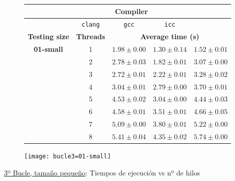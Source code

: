 \begin{figure}[H]
    \centering
    \begin{subfigure}{0.4\textwidth}
        \begin{adjustbox}{width=\textwidth} 
        \begin{tabular}{|c|c|c|c|c|}
            \hline
            \rowcolor{azul} \multicolumn{2}{|c|}{}&\multicolumn{3}{c|}{\textbf{Compiler}} \\ \hline
            \rowcolor{azul} \multicolumn{2}{|c|}{}&\texttt{clang}&\texttt{gcc}&\texttt{icc}\\ \hline
            \rowcolor{azul} \textbf{Testing size} & \textbf{Threads}&\multicolumn{3}{c|}{\textbf{Average time (s)}} \\ \hline
            \multirow{8}{1cm}{\textbf{01-small}} & 1 & \(1.98\pm{0.00}\) & \(1.30\pm{0.14}\) & \(1.52\pm{0.01}\) \\ \cline{2-5}
            & 2 & \(2.78\pm{0.03}\) & \(1.82\pm{0.01}\) & \(3.07\pm{0.00}\) \\ \cline{2-5}
            & 3 & \(2.72\pm{0.01}\) & \(2.22\pm{0.01}\) & \(3.28\pm{0.02}\) \\ \cline{2-5}
            & 4 & \(3.04\pm{0.01}\) & \(2.79\pm{0.00}\) & \(3.70\pm{0.01}\) \\ \cline{2-5}
            & 5 & \(4.53\pm{0.02}\) & \(3.04\pm{0.00}\) & \(4.44\pm{0.03}\) \\ \cline{2-5}
            & 6 & \(4.58\pm{0.01}\) & \(3.51\pm{0.01}\) & \(4.66\pm{0.05}\) \\ \cline{2-5}
            & 7 & \(5.09\pm{0.00}\) & \(3.80\pm{0.01}\) & \(5.22\pm{0.00}\) \\ \cline{2-5}
            & 8 & \(5.41\pm{0.04}\) & \(4.35\pm{0.02}\) & \(5.74\pm{0.00}\) \\ \hline
        \end{tabular}
        \end{adjustbox}
    \end{subfigure}
    \hfill
    \begin{subfigure}{0.5\textwidth}
        \texttt{[image: bucle3=01-small]}
    \end{subfigure}
    \caption{\underline{3º Bucle, tamaño pequeño}: Tiempos de ejecución vs nº de hilos}
    \label{fig:bucle3=01-small}
\end{figure}

